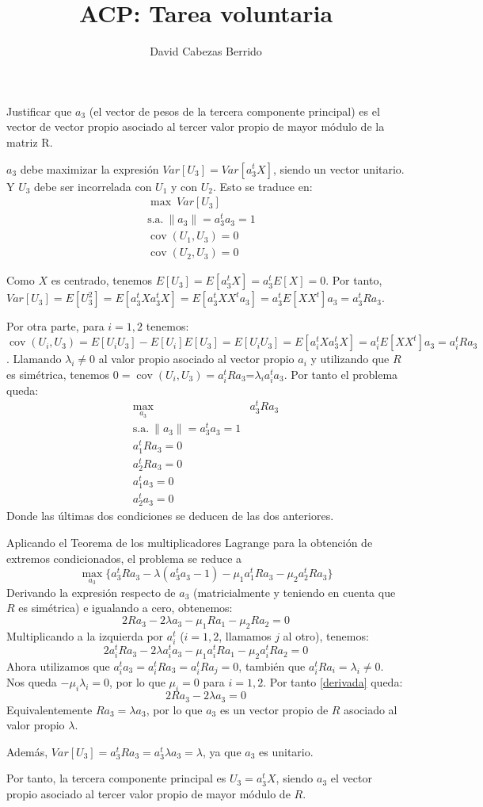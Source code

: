 \documentclass[12pt]{article}
\title{ACP: Tarea voluntaria}
\author{David Cabezas Berrido}
\date{}
\newcommand{\cov}{\operatorname{cov}}
\begin{document}
\maketitle

Justificar que $a_3$ (el vector de pesos de la tercera componente
principal) es el vector de vector propio asociado al tercer valor
propio de mayor módulo de la matriz R.

$a_3$ debe maximizar la expresión $Var[U_3]=Var[a_3^t X]$, siendo un
vector unitario. Y $U_3$ debe ser incorrelada con $U_1$ y con
$U_2$. Esto se traduce en:
\begin{align*}
  \max \ Var[U_3]& \\
  \text{s.a.}\ \|a_3\|=a_3^t a_3=1& \\
  \cov(U_1,U_3)=0& \\
  \cov(U_2,U_3)=0&
\end{align*}

Como $X$ es centrado, tenemos $E[U_3]=E[a_3^t X]=a_3^t E[X]=0$. Por
tanto,
$Var[U_3]=E[U_3^2]=E[a_3^t X a_3^t X]=E[a_3^t XX^ta_3]=a_3^t
E[XX^t]a_3=a_3^t Ra_3$.

Por otra parte, para $i=1,2$ tenemos:
$\cov(U_i,U_3)=E[U_iU_3]-E[U_i]E[U_3]=E[U_i U_3]=E[a_i^t X a_3^t
X]=a_i^t E[X X^t] a_3=a_i^t R a_3$. Llamando $\lambda_i\neq 0$ al
valor propio asociado al vector propio $a_i$ y utilizando que $R$ es
simétrica, tenemos $0=\cov(U_i,U_3)=a_i^t R a_3$=$\lambda_i a_i^t a_3$.
Por tanto el problema queda:
\begin{align*}
  \max\limits_{a_3} & a_3^t Ra_3\\
  \text{s.a.}\ \|a_3\|=a_3^t a_3=1& \\
  a_1^t R a_3=0& \\
  a_2^t R a_3=0& \\
  a_1^t a_3=0& \\
  a_2^t a_3=0&
\end{align*}
Donde las últimas dos condiciones se deducen de las dos anteriores.

Aplicando el Teorema de los multiplicadores Lagrange para la obtención
de extremos condicionados, el problema se reduce a
\[\max\limits_{a_3}\{a_3^t Ra_3 -\lambda(a_3^t a_3-1)-\mu_1 a_1^t R a_3 -\mu_2 a_2^t R a_3\}\]
Derivando la expresión respecto de $a_3$ (matricialmente y teniendo en cuenta que $R$ es simétrica) e igualando a cero, obtenemos:
\begin{equation}\label{derivada}
  2Ra_3-2\lambda a_3-\mu_1 Ra_1-\mu_2 Ra_2=0
  \end{equation}
  Multiplicando a la izquierda por $a_i^t$ ($i=1,2$, llamamos $j$ al
  otro), tenemos:
  \[2a_i^tRa_3-2\lambda a_i^ta_3-\mu_1 a_i^tRa_1-\mu_2 a_i^tRa_2=0\]
  Ahora utilizamos que $a_i^t a_3=a_i^t R a_3=a_i^t R a_j=0$, también
  que $a_i^t Ra_i=\lambda_i\neq 0$. Nos queda $-\mu_i\lambda_i=0$, por
  lo que $\mu_i=0$ para $i=1,2$. Por tanto \ref{derivada} queda:
  \[2Ra_3-2\lambda a_3=0\] Equivalentemente $Ra_3=\lambda a_3$, por lo
  que $a_3$ es un vector propio de $R$ asociado al valor propio
  $\lambda$.

  Además, $Var[U_3]=a_3^t Ra_3=a_3^t \lambda a_3=\lambda$, ya que
  $a_3$ es unitario.

  Por tanto, la tercera componente principal es $U_3=a_3^t X$, siendo
  $a_3$ el vector propio asociado al tercer valor propio de mayor
  módulo de $R$.
\end{document}
